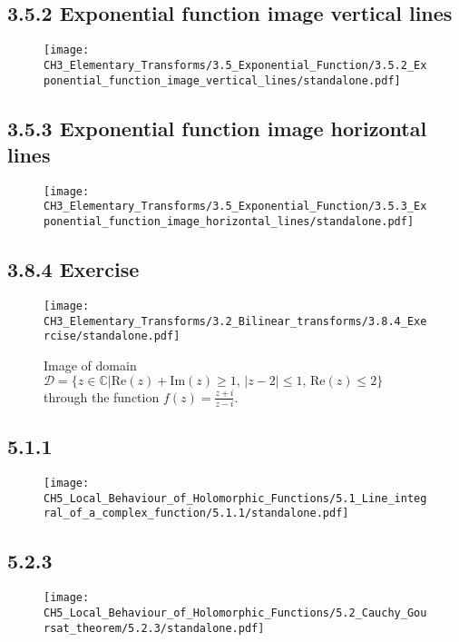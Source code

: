 \documentclass{book}
\begin{document}
\subsection*{3.5.2 Exponential function image vertical lines}
\begin{figure}[H]
\centering
\texttt{[image: CH3\_Elementary\_Transforms/3.5\_Exponential\_Function/3.5.2\_Exponential\_function\_image\_vertical\_lines/standalone.pdf]}
\caption{}
\end{figure}

\subsection*{3.5.3 Exponential function image horizontal lines}
\begin{figure}[H]
\centering
\texttt{[image: CH3\_Elementary\_Transforms/3.5\_Exponential\_Function/3.5.3\_Exponential\_function\_image\_horizontal\_lines/standalone.pdf]}
\caption{}
\end{figure}

\subsection*{3.8.4 Exercise}
\begin{figure}[H]
\centering
\texttt{[image: CH3\_Elementary\_Transforms/3.2\_Bilinear\_transforms/3.8.4\_Exercise/standalone.pdf]}
\caption{Image of domain $\mathcal{D} = \{z\in \mathbb{C} \vert \mathrm{Re}(z) + \mathrm{Im}(z) \ge 1, \, \vert z-2 \vert \le 1, \, \mathrm{Re}(z) \le 2 \}$ through the function $f(z) = \frac{z+i}{z-i}$.}
\end{figure}

\subsection*{5.1.1}
\begin{figure}[H]
\centering
\texttt{[image: CH5\_Local\_Behaviour\_of\_Holomorphic\_Functions/5.1\_Line\_integral\_of\_a\_complex\_function/5.1.1/standalone.pdf]}
\caption{}
\end{figure}

\subsection*{5.2.3}
\begin{figure}[H]
\centering
\texttt{[image: CH5\_Local\_Behaviour\_of\_Holomorphic\_Functions/5.2\_Cauchy\_Goursat\_theorem/5.2.3/standalone.pdf]}
\caption{}
\end{figure}
\end{document}
